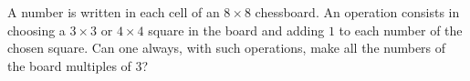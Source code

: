 A number is written in each cell of an $8 \times 8$ chessboard. An operation consists in choosing a $3 \times 3$ or $4 \times 4$ square in the board and adding $1$ to each number of the chosen square. Can one always, with such operations, make all the numbers of the board multiples of $3$?
